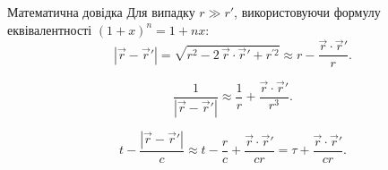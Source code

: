 \documentclass[9pt]{beamer}
\let\vect\vec
\begin{document}
\begin{frame}{Математична довідка}
	Для випадку $ r \gg r' $, використовуючи формулу еквівалентності $ (1 + x)^n = 1 + nx $:
	\begin{equation*}
		|\vect{r} - \vect{r}'|  = \sqrt{r^2 -2\, \vect{r} \cdot \vect{r}' + r^{\prime 2} } \approx r - \frac{\vect{r} \cdot \vect{r}'}{r}.
	\end{equation*}

	\begin{equation*}
		\frac1{|\vect{r} - \vect{r}'|} \approx \frac1{r} + \frac{\vect{r} \cdot \vect{r}'}{r^3}.
	\end{equation*}

	\begin{equation*}
		t - \frac{|\vect{r} - \vect{r}'|}{c} \approx t - \frac{r}{c} + \frac{\vect{r} \cdot \vect{r}'}{cr} = \tau + \frac{\vect{r} \cdot \vect{r}'}{cr}.
	\end{equation*}
\end{frame}
\end{document}
